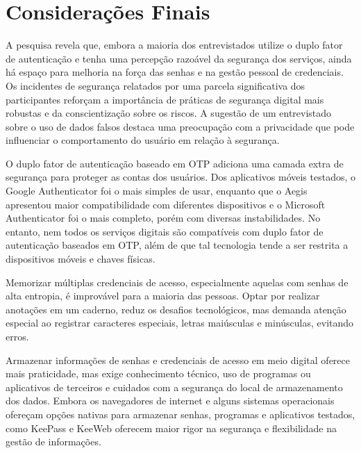 \documentclass[12pt]{article}
\begin{document}
\section{Considerações Finais}


A pesquisa revela que, embora a maioria dos entrevistados utilize o duplo fator de
autenticação e tenha uma percepção razoável da segurança dos serviços, ainda há
espaço para melhoria na força das senhas e na gestão pessoal de credenciais.
Os incidentes de segurança relatados por uma parcela significativa dos participantes
reforçam a importância de práticas de segurança digital mais robustas e da
conscientização sobre os riscos.
A sugestão de um entrevistado sobre o uso de dados falsos destaca uma preocupação
com a privacidade que pode influenciar o comportamento do usuário em relação à
segurança.


O duplo fator de autenticação baseado em OTP adiciona uma camada extra de segurança
para proteger as contas dos usuários.
Dos aplicativos móveis testados, o Google Authenticator foi o mais simples de usar,
enquanto que o Aegis apresentou maior compatibilidade com diferentes dispositivos e
o Microsoft Authenticator foi o mais completo, porém com diversas instabilidades.
No entanto, nem todos os serviços digitais são compatíveis com duplo fator de
autenticação baseados em OTP, além de que tal tecnologia tende a ser restrita a
dispositivos móveis e chaves físicas.

Memorizar múltiplas credenciais de acesso, especialmente aquelas com senhas de alta
entropia, é improvável para a maioria das pessoas.
Optar por realizar anotações em um caderno, reduz os desafios tecnológicos, mas
demanda atenção especial ao registrar caracteres especiais, letras maiúsculas e
minúsculas, evitando erros.

Armazenar informações de senhas e credenciais de acesso em meio digital oferece mais
praticidade, mas exige conhecimento técnico, uso de programas ou aplicativos de
terceiros e cuidados com a segurança do local de armazenamento dos dados.
Embora os navegadores de internet e alguns sistemas operacionais ofereçam opções
nativas para armazenar senhas, programas e aplicativos testados, como KeePass e KeeWeb
oferecem maior rigor na segurança e flexibilidade na gestão de informações.
\end{document}
